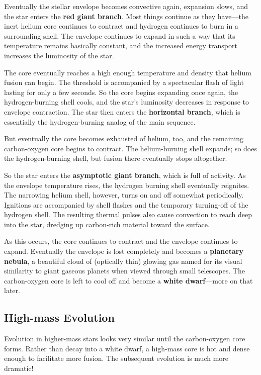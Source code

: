 \documentclass[../a062main.tex]{subfiles}
\begin{document}
Eventually the stellar envelope becomes convective again, expansion slows, and the star enters the \textbf{red giant branch}.
Most things continue as they have---the inert helium core continues to contract and hydrogen continues to burn in a surrounding shell.
The envelope continues to expand in such a way that its temperature remains basically constant, and the increased energy transport increases the luminosity of the star.

The core eventually reaches a high enough temperature and density that helium fusion can begin.
The threshold is accompanied by a spectacular flash of light lasting for only a few seconds.
So the core begins expanding once again, the hydrogen-burning shell cools, and the star's luminosity decreases in response to envelope contraction.
The star then enters the \textbf{horizontal branch}, which is essentially the hydrogen-burning analog of the main sequence.

But eventually the core becomes exhausted of helium, too, and the remaining carbon-oxygen core begins to contract.
The helium-burning shell expands; so does the hydrogen-burning shell, but fusion there eventually stops altogether.

So the star enters the \textbf{asymptotic giant branch}, which is full of activity.
As the envelope temperature rises, the hydrogen burning shell eventually reignites.
The narrowing helium shell, however, turns on and off somewhat periodically.
Ignitions are accompanied by shell flashes and the temporary turning-off of the hydrogen shell.
The resulting thermal pulses also cause convection to reach deep into the star, dredging up carbon-rich material toward the surface.

As this occurs, the core continues to contract and the envelope continues to expand.
Eventually the envelope is lost completely and becomes a \textbf{planetary nebula}, a beautiful cloud of (optically thin) glowing gas named for its visual similarity to giant gaseous planets when viewed through small telescopes.
The carbon-oxygen core is left to cool off and become a \textbf{white dwarf}---more on that later.

\subsection*{High-mass Evolution}
Evolution in higher-mass stars looks very similar until the carbon-oxygen core forms.
Rather than decay into a white dwarf, a high-mass core is hot and dense enough to facilitate more fusion.
The subsequent evolution is much more dramatic!
\end{document}
